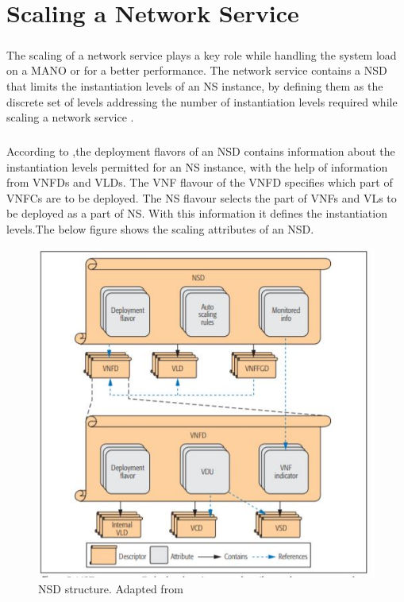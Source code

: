 \chapter{Scaling a Network Service}
\label{ch:Scaling a Network Service}

\paragraph{}The scaling of a network service plays a key role while handling the system load on a MANO or for a better performance. The network service contains a NSD that limits the instantiation levels of an NS instance, by defining them as the discrete set of levels addressing the number of instantiation levels required while scaling a network service \cite{adamuz2018automated}.

\paragraph{}According to \cite{adamuz2018automated},the deployment flavors of an NSD contains information about the instantiation levels permitted for an NS instance, with the help of information from VNFDs and VLDs. The VNF flavour of the VNFD specifies which part of VNFCs are to be deployed. The NS flavour selects the part of VNFs and VLs to be deployed as a part of NS. With this information it defines the instantiation levels.The below figure shows the scaling attributes of an NSD.

\begin{figure} [H]
	\centering
	\includegraphics[width=0.6\linewidth]{"figures/NSD structure"}
	\caption{NSD structure. Adapted from \cite{adamuz2018automated}}
	\label{fig:nsd-structure}
\end{figure}




